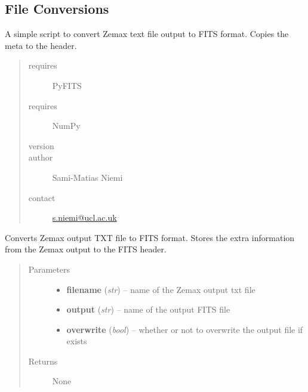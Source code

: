 \documentclass[a4paper,11pt,english]{sphinxmanual}
\begin{document}
\label{support:module-support.convertZemaxOutputToFITS}

\subsection{File Conversions}
\label{support:file-conversions}
A simple script to convert Zemax text file output to FITS format.
Copies the meta to the header.
\begin{quote}\begin{description}
\item[{requires}] \leavevmode
PyFITS

\item[{requires}] \leavevmode
NumPy

\item[{version}] 

\item[{author}] \leavevmode
Sami-Matias Niemi

\item[{contact}] \leavevmode
\href{mailto:s.niemi@ucl.ac.uk}{s.niemi@ucl.ac.uk}

\end{description}\end{quote}

\begin{fulllineitems}
\label{support:support.convertZemaxOutputToFITS.convertToFITS}
Converts Zemax output TXT file to FITS format. Stores the
extra information from the Zemax output to the FITS header.
\begin{quote}\begin{description}
\item[{Parameters}] \leavevmode\begin{itemize}
\item {} 
\textbf{filename} (\emph{str}) -- name of the Zemax output txt file

\item {} 
\textbf{output} (\emph{str}) -- name of the output FITS file

\item {} 
\textbf{overwrite} (\emph{bool}) -- whether or not to overwrite the output file if exists

\end{itemize}

\item[{Returns}] \leavevmode
None

\end{description}\end{quote}

\end{fulllineitems}
\end{document}
